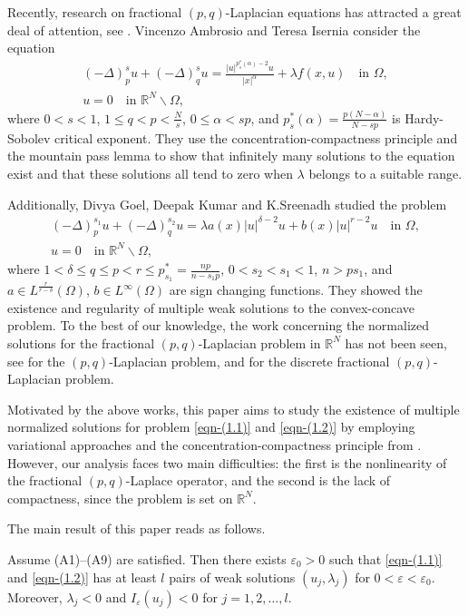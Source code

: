 \documentclass[reqno]{amsart}
\begin{document}
Recently, research on fractional $(p,q)$-Laplacian equations has attracted a great deal of
attention, see \cite{ref9, ref30, ref37}. Vincenzo Ambrosio and Teresa Isernia \cite{ref2} consider the equation
\begin{gather*}
(-\Delta)_p^{s}u+(-\Delta)_q^{s}u=\frac{|u|^{p_s^{*}(\alpha)-2}u}{|x|^{\alpha}}+\lambda f(x,u)\quad\text{in }\Omega,\\
u=0\quad\text{in }\mathbb{R}^N\backslash\Omega,
\end{gather*}
where $0<s<1$, $1\le q<p<\frac{N}{s}$, $0\le\alpha<sp$, and
$p_s^{*}(\alpha)=\frac{p(N-\alpha)}{N-sp}$ is Hardy-Sobolev critical exponent.
They use the concentration-compactness principle and the mountain pass lemma to show
that infinitely many solutions to the equation exist and that these solutions all tend to zero
when $\lambda$ belongs to a suitable range.

Additionally, Divya Goel, Deepak Kumar and K.Sreenadh \cite{ref16} studied the problem
\begin{gather*}
(-\Delta)_p^{s_1} u+(-\Delta)_q^{s_2} u=\lambda a(x)|u|^{\delta-2}u+ b(x) |u|^{r-2}u\quad\text{in }\Omega,\\
u=0 \quad\text{in }\mathbb{R}^N\backslash\Omega,
\end{gather*}
where $1<\delta\le q\le p<r\le p_{s_1}^{*}=\frac{np}{n-s_1p}$, $0<s_2<s_1<1$, $n>ps_1$,
and $a\in L^{\frac{r}{r-\delta}}(\Omega)$, $b\in L^{\infty}(\Omega)$ are sign changing
functions. They showed the existence and regularity of multiple weak solutions to the
convex-concave problem. To the best of our knowledge, the work concerning the
normalized solutions for the fractional $(p,q)$-Laplacian problem in $\mathbb{R}^N$ has not
been seen, see \cite{n3} for the $(p,q)$-Laplacian problem, and \cite{ref33} for the discrete fractional $(p,q)$-Laplacian problem.

Motivated by the above works, this paper aims to study the existence of multiple normalized
solutions for problem \eqref{eqn-(1.1)} and \eqref{eqn-(1.2)} by employing variational
approaches and  the concentration-compactness principle from \cite{ref1, ref13}.
However, our analysis faces two main difficulties: the first is the nonlinearity of the 
fractional $(p,q)$-Laplace operator, and the second is the lack of compactness,
since the problem  is set on $\mathbb{R}^N$.

 The main result of this paper reads as follows.

\begin{theorem}\label{theorem:1.1}
Assume {\rm (A1)--(A9)} are satisfied.
 Then there exists $\varepsilon_0>0$ such that  \eqref{eqn-(1.1)} and \eqref{eqn-(1.2)}
 has at least $l$ pairs of weak solutions $(u_j,\lambda_j)$ for $0<\varepsilon<\varepsilon_0$. Moreover, $\lambda_j<0$ and $I_{\varepsilon}(u_j)<0$ for $j=1,2,\dots,l$.
\end{theorem}
\end{document}
